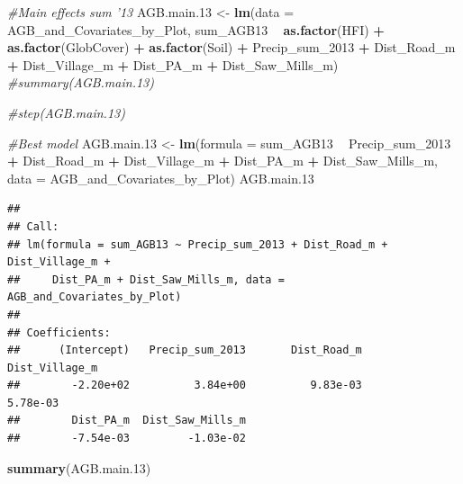 \documentclass[12pt,]{article}
\newenvironment{Shaded}{\begin{snugshade}}{\end{snugshade}}
\newcommand{\CommentTok}[1]{\textcolor[rgb]{0.56,0.35,0.01}{\textit{#1}}}
\newcommand{\DataTypeTok}[1]{\textcolor[rgb]{0.13,0.29,0.53}{#1}}
\newcommand{\DecValTok}[1]{\textcolor[rgb]{0.00,0.00,0.81}{#1}}
\newcommand{\FloatTok}[1]{\textcolor[rgb]{0.00,0.00,0.81}{#1}}
\newcommand{\KeywordTok}[1]{\textcolor[rgb]{0.13,0.29,0.53}{\textbf{#1}}}
\newcommand{\NormalTok}[1]{#1}
\newcommand{\OperatorTok}[1]{\textcolor[rgb]{0.81,0.36,0.00}{\textbf{#1}}}
\newcommand{\StringTok}[1]{\textcolor[rgb]{0.31,0.60,0.02}{#1}}
\begin{document}
\begin{Shaded}
\begin{Highlighting}[]
\CommentTok{#Main effects sum '13}
\NormalTok{AGB.main}\FloatTok{.13}\NormalTok{ <-}\StringTok{ }\KeywordTok{lm}\NormalTok{(}\DataTypeTok{data =}\NormalTok{ AGB_and_Covariates_by_Plot, sum_AGB13 }\OperatorTok{~}\StringTok{ }
\StringTok{                    }\KeywordTok{as.factor}\NormalTok{(HFI) }\OperatorTok{+}\StringTok{ }\KeywordTok{as.factor}\NormalTok{(GlobCover) }\OperatorTok{+}\StringTok{ }\KeywordTok{as.factor}\NormalTok{(Soil) }\OperatorTok{+}
\StringTok{                    }\NormalTok{Precip_sum_}\DecValTok{2013} \OperatorTok{+}\StringTok{ }\NormalTok{Dist_Road_m }\OperatorTok{+}\StringTok{ }\NormalTok{Dist_Village_m }\OperatorTok{+}\StringTok{ }\NormalTok{Dist_PA_m }\OperatorTok{+}\StringTok{ }
\StringTok{                    }\NormalTok{Dist_Saw_Mills_m)}
\CommentTok{#summary(AGB.main.13)}

\CommentTok{#step(AGB.main.13)}

\CommentTok{#Best model}
\NormalTok{AGB.main}\FloatTok{.13}\NormalTok{ <-}\StringTok{ }\KeywordTok{lm}\NormalTok{(}\DataTypeTok{formula =}\NormalTok{ sum_AGB13 }\OperatorTok{~}\StringTok{ }\NormalTok{Precip_sum_}\DecValTok{2013} \OperatorTok{+}\StringTok{ }
\StringTok{                    }\NormalTok{Dist_Road_m }\OperatorTok{+}\StringTok{ }\NormalTok{Dist_Village_m }\OperatorTok{+}\StringTok{ }\NormalTok{Dist_PA_m }\OperatorTok{+}\StringTok{ }
\StringTok{                    }\NormalTok{Dist_Saw_Mills_m, }\DataTypeTok{data =}\NormalTok{ AGB_and_Covariates_by_Plot)}
\NormalTok{AGB.main}\FloatTok{.13}
\end{Highlighting}
\end{Shaded}

\begin{verbatim}
## 
## Call:
## lm(formula = sum_AGB13 ~ Precip_sum_2013 + Dist_Road_m + Dist_Village_m + 
##     Dist_PA_m + Dist_Saw_Mills_m, data = AGB_and_Covariates_by_Plot)
## 
## Coefficients:
##      (Intercept)   Precip_sum_2013       Dist_Road_m    Dist_Village_m  
##        -2.20e+02          3.84e+00          9.83e-03          5.78e-03  
##        Dist_PA_m  Dist_Saw_Mills_m  
##        -7.54e-03         -1.03e-02
\end{verbatim}

\begin{Shaded}
\begin{Highlighting}[]
\KeywordTok{summary}\NormalTok{(AGB.main}\FloatTok{.13}\NormalTok{)}
\end{Highlighting}
\end{Shaded}
\end{document}
